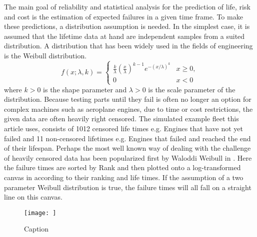 The main goal of reliability and statistical analysis for the prediction of life, risk and cost is the estimation of expected failures in a given time frame. To make these predictions, a distribution assumption is needed. In the simplest case, it is assumed that the lifetime data at hand are independent samples from a suited distribution. A distribution that has been widely used in the fields of engineering is the Weibull distribution. 
\begin{equation}
f(x;\lambda ,k)={\begin{cases}{\frac {k}{\lambda }}\left({\frac {x}{\lambda }}\right)^{k-1}e^{-(x/\lambda )^{k}}&x\geq 0, \\ 0&x<0\end{cases}}
\end{equation}
where $k > 0$ is the shape parameter and $\lambda > 0$ is the scale parameter of the distribution. Because testing parts until they fail is often no longer an option for complex machines such as aeroplane engines, due to time or cost restrictions, the given data are often heavily right censored. The simulated example fleet this article uses, consists of 1012 censored life times e.g. Engines that have not yet failed and 11 non-censored lifetimes e.g. Engines that failed and reached the end of their lifespan. Perhaps the most well known way of dealing with the challenge of heavily censored data has been popularized first by Waloddi Weibull in \cite{waloddiweibull}. Here the failure times are sorted by Rank and then plotted onto a log-transformed canvas in according to their ranking and life times. If the assumption of a two parameter Weibull distribution is true, the failure times will all fall on a straight line on this canvas. 
\begin{figure}
    \centering
    \texttt{[image: ]}
    \caption{Caption}
    \label{fig:weibullfit}
\end{figure}

